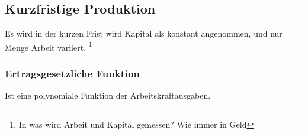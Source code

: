 \subsection{Kurzfristige Produktion}
    Es wird in der kurzen Frist wird Kapital als konstant angenommen, und nur Menge Arbeit variiert. \footnote{In was wird Arbeit und Kapital gemessen? Wie immer in Geld}

\subsubsection{Ertragsgesetzliche Funktion}
Ist eine polynomiale Funktion der Arbeitskraftausgaben.